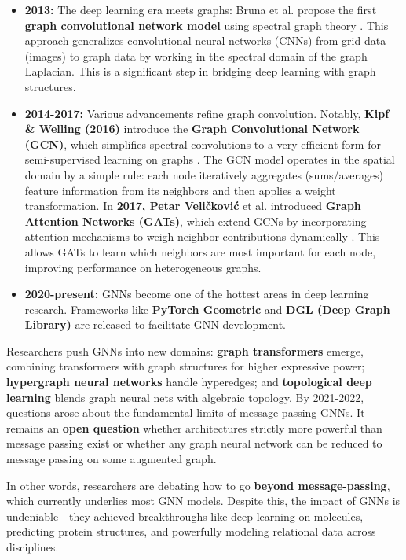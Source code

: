 \documentclass{article}
\begin{document}
\begin{itemize}
      \item \textbf{2013:} The deep learning era meets graphs: Bruna et al. propose the first \textbf{graph convolutional network model} using spectral graph theory \cite{bruna2013spectral}. This approach generalizes convolutional neural networks (CNNs) from grid data (images) to graph data by working in the spectral domain of the graph Laplacian. This is a significant step in bridging deep learning with graph structures.
      \item \textbf{2014-2017:} Various advancements refine graph convolution. Notably, \textbf{Kipf \& Welling (2016)} introduce the \textbf{Graph Convolutional Network (GCN)}, which simplifies spectral convolutions to a very efficient form for semi-supervised learning on graphs \cite{kipf2017semigcn}. The GCN model operates in the spatial domain by a simple rule: each node iteratively aggregates (sums/averages) feature information from its neighbors and then applies a weight transformation. In \textbf{2017, Petar Veličković} et al. introduced \textbf{Graph Attention Networks (GATs)}, which extend GCNs by incorporating attention mechanisms to weigh neighbor contributions dynamically \cite{veličković2018graphattentionnetworks}. This allows GATs to learn which neighbors are most important for each node, improving performance on heterogeneous graphs.
      \item \textbf{2020-present:} GNNs become one of the hottest areas in deep learning research. Frameworks like \textbf{PyTorch Geometric} \cite{pytorch_geometric} and \textbf{DGL (Deep Graph Library)} \cite{dgl} are released to facilitate GNN development.

\end{itemize}

Researchers push GNNs into new domains: \textbf{graph transformers} emerge, combining transformers with graph structures for higher expressive power;
\textbf{hypergraph neural networks} handle hyperedges;
and \textbf{topological deep learning} blends graph neural nets with algebraic topology.
By 2021-2022, questions arose about the fundamental limits of message-passing GNNs. It remains an \textbf{open question} whether architectures strictly more powerful than message passing exist or whether any graph neural network can be reduced to message passing on some augmented graph.

In other words, researchers are debating how to go \textbf{beyond message-passing}, which currently underlies most GNN models.
Despite this, the impact of GNNs is undeniable - they achieved breakthroughs like deep learning on molecules, predicting protein structures, and powerfully modeling relational data across disciplines.
\end{document}
